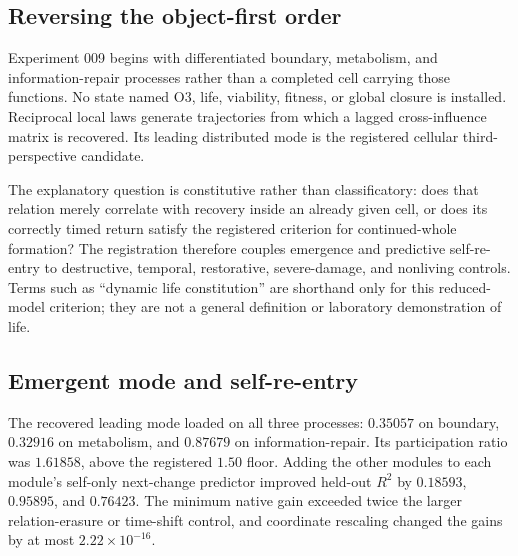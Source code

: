\documentclass[11pt,a4paper]{article}
\begin{document}
\subsection{Reversing the object-first order}

Experiment 009 begins with differentiated boundary, metabolism, and information-repair processes rather than a completed cell carrying those functions. No state named O3, life, viability, fitness, or global closure is installed. Reciprocal local laws generate trajectories from which a lagged cross-influence matrix is recovered. Its leading distributed mode is the registered cellular third-perspective candidate.

The explanatory question is constitutive rather than classificatory: does that relation merely correlate with recovery inside an already given cell, or does its correctly timed return satisfy the registered criterion for continued-whole formation? The registration therefore couples emergence and predictive self-re-entry to destructive, temporal, restorative, severe-damage, and nonliving controls. Terms such as ``dynamic life constitution'' are shorthand only for this reduced-model criterion; they are not a general definition or laboratory demonstration of life.

\subsection{Emergent mode and self-re-entry}

The recovered leading mode loaded on all three processes: $0.35057$ on boundary, $0.32916$ on metabolism, and $0.87679$ on information-repair. Its participation ratio was $1.61858$, above the registered $1.50$ floor. Adding the other modules to each module's self-only next-change predictor improved held-out $R^2$ by $0.18593$, $0.95895$, and $0.76423$. The minimum native gain exceeded twice the larger relation-erasure or time-shift control, and coordinate rescaling changed the gains by at most $2.22\times10^{-16}$.
\end{document}
